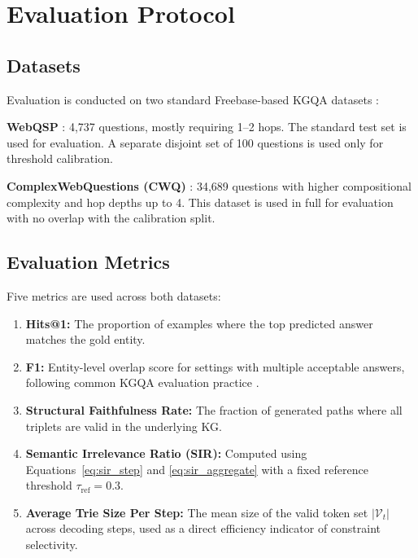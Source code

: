 \section{Evaluation Protocol}
\label{sec:ch3eval}

\subsection{Datasets}

Evaluation is conducted on two standard Freebase-based KGQA datasets \citep{bollacker2008freebase}:

\textbf{WebQSP} \citep{yih2016websqp}: 4,737 questions, mostly requiring 1--2 hops. The standard test set is used for evaluation. A separate disjoint set of 100 questions is used only for threshold calibration.

\textbf{ComplexWebQuestions (CWQ)} \citep{talmor2018cwq}: 34,689 questions with higher compositional complexity and hop depths up to 4. This dataset is used in full for evaluation with no overlap with the calibration split.

\subsection{Evaluation Metrics}

Five metrics are used across both datasets:

\begin{enumerate}
  \item \textbf{Hits@1:} The proportion of examples where the top predicted answer matches the gold entity.

  \item \textbf{F1:} Entity-level overlap score for settings with multiple acceptable answers, following common KGQA evaluation practice \citep{lan2022survey}.

  \item \textbf{Structural Faithfulness Rate:} The fraction of generated paths where all triplets are valid in the underlying KG.

  \item \textbf{Semantic Irrelevance Ratio (SIR):} Computed using Equations~\eqref{eq:sir_step} and \eqref{eq:sir_aggregate} with a fixed reference threshold $\tau_{\text{ref}}=0.3$.

  \item \textbf{Average Trie Size Per Step:} The mean size of the valid token set $|\mathcal{V}_t|$ across decoding steps, used as a direct efficiency indicator of constraint selectivity.
\end{enumerate}

